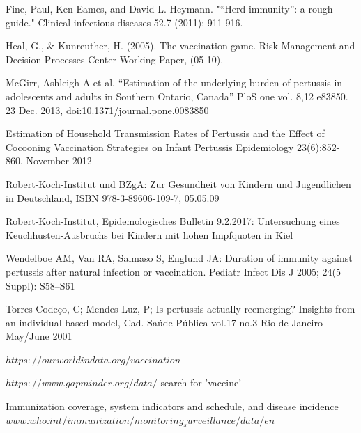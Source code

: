 \documentclass[11pt]{article}
\begin{document}
Fine, Paul, Ken Eames, and David L. Heymann. "“Herd immunity”: a rough guide." Clinical infectious diseases 52.7 (2011): 911-916.
\vspace{14px}

Heal, G., \& Kunreuther, H. (2005). The vaccination game. Risk Management and Decision Processes Center Working Paper, (05-10). 
\vspace{14px}

McGirr, Ashleigh A et al. “Estimation of the underlying burden of pertussis in adolescents and adults in Southern Ontario, Canada” PloS one vol. 8,12 e83850. 23 Dec. 2013, doi:10.1371/journal.pone.0083850
\vspace{14px}

Estimation of Household Transmission Rates of Pertussis and the Effect of Cocooning Vaccination Strategies on Infant Pertussis Epidemiology 23(6):852-860, November 2012
\vspace{14px}

Robert-Koch-Institut und BZgA: Zur Gesundheit von Kindern und Jugendlichen in Deutschland, ISBN 978-3-89606-109-7, 05.05.09
\vspace{14px}

Robert-Koch-Institut, Epidemologisches Bulletin 9.2.2017: Untersuchung eines Keuchhusten-Ausbruchs bei Kindern mit hohen Impfquoten in Kiel
\vspace{14px}

Wendelboe AM, Van RA, Salmaso S, Englund JA: Duration of immunity against pertussis after natural infection or vaccination. Pediatr Infect Dis J 2005; 24(5 Suppl): S58–S61
\vspace{14px}

Torres Codeço, C; Mendes Luz, P; Is pertussis actually reemerging? Insights from an individual-based model, Cad. Saúde Pública vol.17 no.3 Rio de Janeiro May/June 2001
\vspace{14px}

$https://ourworldindata.org/vaccination$ 
\vspace{14px}

$https://www.gapminder.org/data/$ search for 'vaccine'
\vspace{14px}

Immunization coverage, system indicators and schedule, and disease incidence $www.who.int/immunization/monitoring_surveillance/data/en$


\newpage
\end{document}
